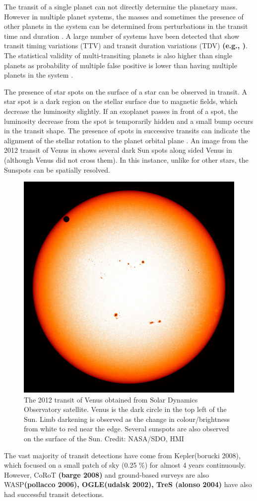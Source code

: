 The transit of a single planet can not directly determine the planetary mass.
However in multiple planet systems, the masses and sometimes the presence of other planets in the system can be determined from perturbations in the transit time and duration \citep[e.g.][]{holman_use_2005, holman_kepler9_2010}.
A large number of systems have been detected that show transit timing variations (TTV) and transit duration variations (TDV) \textbf{(e.g.\citet{carter__2012}, \citep{holczer_transit_2016})}.
The statistical validity of multi-transiting planets is also higher than single planets as probability of multiple false positive is lower than having multiple planets in the system \citet{lissauer_almost_2012}.

The presence of star spots on the surface of a star can be observed in transit.
A star spot is a dark region on the stellar surface due to magnetic fields, which decrease the luminosity slightly.
If an exoplanet passes in front of a spot, the luminosity decrease from the spot is temporarily hidden and a small bump occurs in the transit shape.
The presence of spots in successive transits can indicate the alignment of the stellar rotation to the planet orbital plane \citet{Sanchis-Ojeda et al 2012}.
An image from the 2012 transit of Venus in shows several dark Sun spots along sided Venus in  (although Venus did not cross them).
In this instance, unlike for other stars, the Sunspots can be spatially resolved.

\begin{figure}
    \centering
    \includegraphics[width=0.3\linewidth]{./figures/introduction/SDO_2012_Venus_Transit.jpg}
    \caption{The 2012 transit of Venus obtained from Solar Dynamics Observatory satellite. Venus is the dark circle in the top left of the Sun. Limb darkening is observed as the change in colour/brightness from white to red near the edge. Several sunspots are also observed on the surface of the Sun. Credit: NASA/SDO, HMI}
    \label{fig:transit_venus}
\end{figure}


The vast majority of transit detections have come from Kepler\citep{borucki_characteristics_2011}(borucki 2008), which focused on a small patch of sky (0.25 \%) for almost 4 years continuously.
However, CoRoT \textbf{(barge 2008)} and ground-based surveys are also WASP\citet{pollacco_wasp_2006}\textbf{(pollacco 2006), OGLE(udalsk 2002), TreS (alonso 2004) } have also had successful transit detections.

